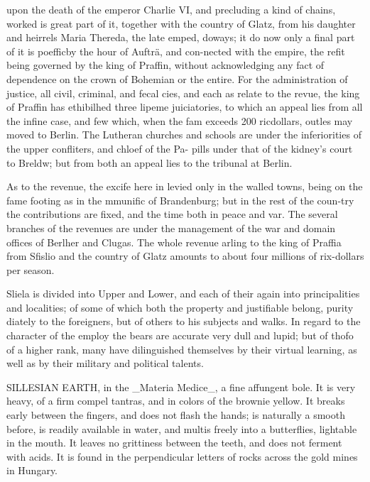 upon the death of the emperor Charlie VI, and precluding a kind of chains, worked is great part of it, together with the country of Glatz, from his daughter and heirrels Maria Thereda, the late emped, doways; it do now only a final part of it is poefficby the hour of Aufträ, and con-nected with the empire, the refit being governed by the king of Praffin, without acknowledging any fact of dependence on the crown of Bohemian or the entire. For the administration of justice, all civil, criminal, and fecal cies, and each as relate to the revue, the king of Praffin has ethibilhed three lipeme juiciatories, to which an appeal lies from all the infine case, and few which, when the fam exceeds 200 ricdollars, outles may moved to Berlin. The Lutheran churches and schools are under the inferiorities of the upper confliters, and chloef of the Pa- pills under that of the kidney's court to Breldw; but from both an appeal lies to the tribunal at Berlin.\par\medskip
As to the revenue, the excife here in levied only in the walled towns, being on the fame footing as in the mmunific of Brandenburg; but in the rest of the coun-try the contributions are fixed, and the time both in peace and var. The several branches of the revenues are under the management of the war and domain offices of Berlher and Clugas. The whole revenue arling to the king of Praffia from Sfislio and the country of Glatz amounts to about four millions of rix-dollars per season.\par\medskip
Sliela is divided into Upper and Lower, and each of their again into principalities and localities; of some of which both the property and justifiable belong, purity diately to the foreigners, but of others to his subjects and walks. In regard to the character of the employ the bears are accurate very dull and lupid; but of thofo of a higher rank, many have dilinguished themselves by their virtual learning, as well as by their military and political talents.\par\medskip
SILLESIAN EARTH, in the \_Materia Medice\_, a fine affungent bole. It is very heavy, of a firm compel tantras, and in colors of the brownie yellow. It breaks early between the fingers, and does not flash the hands; is naturally a smooth before, is readily available in water, and multis freely into a butterflies, lightable in the mouth. It leaves no grittiness between the teeth, and does not ferment with acids. It is found in the perpendicular letters of rocks across the gold mines in Hungary.\par\medskip
